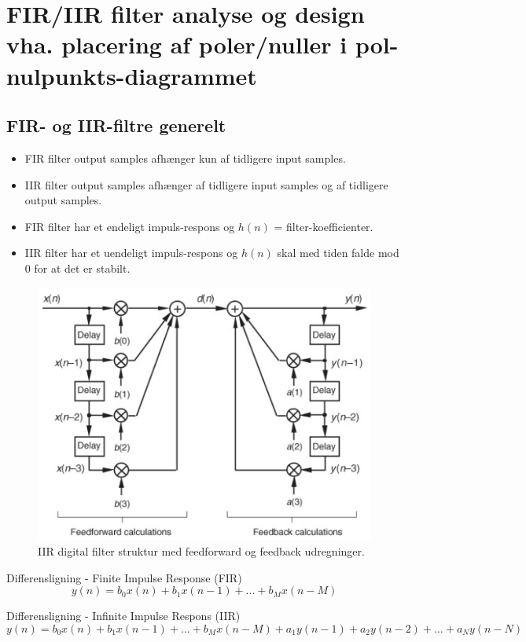 \documentclass[danish]{article}
\begin{document}
\section{FIR/IIR filter analyse og design vha. placering af poler/nuller i pol-nulpunkts-diagrammet}

\subsection{FIR- og IIR-filtre generelt}
\begin{itemize} 
	\item FIR filter output samples afhænger kun af tidligere input samples.
	\item IIR filter output samples afhænger af tidligere input samples og af tidligere  output samples.
	\item FIR filter har et endeligt impuls-respons og $h(n)$ = filter-koefficienter.
	\item IIR filter har et uendeligt impuls-respons og $h(n)$ skal med tiden falde mod 0 for at det er stabilt. 
\end{itemize}

\begin{figure}[H]
	\centering
	\includegraphics[width=0.6\linewidth]{graphics/iir}
	\caption{IIR digital filter struktur med feedforward og feedback udregninger.}
	\label{fig:iir}
\end{figure}

Differensligning - Finite Impulse Response (FIR)
\begin{equation}
y(n) = b_0 x(n) + b_1 x(n-1) + ... + b_M x(n-M)
\end{equation}

Differensligning - Infinite Impulse Respons (IIR)
\begin{equation}
y(n) = b_0 x(n) + b_1 x(n-1) + ... + b_M x(n-M) + a_1 y(n-1) + a_2 y(n-2) + ... + a_N y(n-N)
\end{equation}
\end{document}
